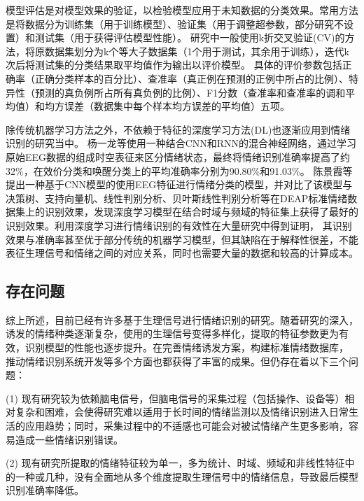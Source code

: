 \raggedbottom
模型评估是对模型效果的验证，以检验模型应用于未知数据的分类效果。常用方法是将数据分为训练集（用于训练模型）、验证集（用于调整超参数，部分研究不设置）和测试集（用于获得评估模型性能）。
研究中一般使用k折交叉验证(CV)的方法，将原数据集划分为k个等大子数据集（1个用于测试，其余用于训练），迭代k次后将测试集的分类结果取平均值作为输出以评价模型。
具体的评价参数包括正确率（正确分类样本的百分比）、查准率（真正例在预测的正例中所占的比例）、特异性（预测的真负例所占所有真负例的比例）、F1分数（查准率和查准率的调和平均值）和均方误差（数据集中每个样本均方误差的平均值）五项。

除传统机器学习方法之外，不依赖于特征的深度学习方法(DL)也逐渐应用到情绪识别的研究当中。
杨一龙等\cite{YangYilong2018}使用一种结合CNN和RNN的混合神经网络，通过学习原始EEG数据的组成时空表征来区分情绪状态，最终将情绪识别准确率提高了约32\%，在效价分类和唤醒分类上的平均准确率分别为90.80\%和91.03\%。
陈景霞等\cite{ChenJX2019}提出一种基于CNN模型的使用EEG特征进行情绪分类的模型，并对比了该模型与决策树、支持向量机、线性判别分析、贝叶斯线性判别分析等在DEAP标准情绪数据集上的识别效果，发现深度学习模型在结合时域与频域的特征集上获得了最好的识别效果。利用深度学习进行情绪识别的有效性在大量研究中得到证明，
其识别效果与准确率甚至优于部分传统的机器学习模型，但其缺陷在于解释性很差，不能表征生理信号和情绪之间的对应关系，同时也需要大量的数据和较高的计算成本。


\subsection{存在问题}
综上所述，目前已经有许多基于生理信号进行情绪识别的研究。随着研究的深入，诱发的情绪种类逐渐复杂，使用的生理信号变得多样化，提取的特征参数更为有效，识别模型的性能也逐步提升。在完善情绪诱发方案，构建标准情绪数据库，
推动情绪识别系统开发等多个方面也都获得了丰富的成果。但仍存在着以下三个问题：

(1) 现有研究较为依赖脑电信号，但脑电信号的采集过程（包括操作、设备等）相对复杂和困难，会使得研究难以适用于长时间的情绪监测以及情绪识别进入日常生活的应用趋势；同时，采集过程中的不适感也可能会对被试情绪产生更多影响，容易造成一些情绪识别错误。

(2) 现有研究所提取的情绪特征较为单一，多为统计、时域、频域和非线性特征中的一种或几种，没有全面地从多个维度提取生理信号中的情绪信息，导致最后模型识别准确率降低。

